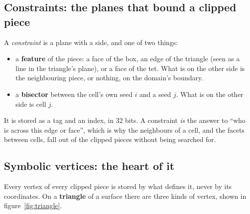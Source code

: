 \documentclass[11pt,a4paper]{article}
\begin{document}
\subsection{Constraints: the planes that bound a clipped piece}\label{ssec:constraints}

A \emph{constraint} is a plane with a side, and one of two things:

\begin{itemize}
\item a \textbf{feature} of the piece: a face of the box, an edge of the triangle (seen as a line
  in the triangle's plane), or a face of the tet. What is on the other side is the neighbouring
  piece, or nothing, on the domain's boundary.
\item a \textbf{bisector} between the cell's own seed $i$ and a seed $j$. What is on the other
  side is cell $j$.
\end{itemize}

It is stored as a tag and an index, in 32 bits. A constraint \emph{is} the answer to ``who is
across this edge or face'', which is why the neighbours of a cell, and the facets between cells,
fall out of the clipped pieces without being searched for.

\subsection{Symbolic vertices: the heart of it}\label{ssec:symbolic}

Every vertex of every clipped piece is stored by what defines it, never by its coordinates. On
a \textbf{triangle} of a surface there are three kinds of vertex, shown in
figure~\ref{fig:triangle}.
\end{document}
